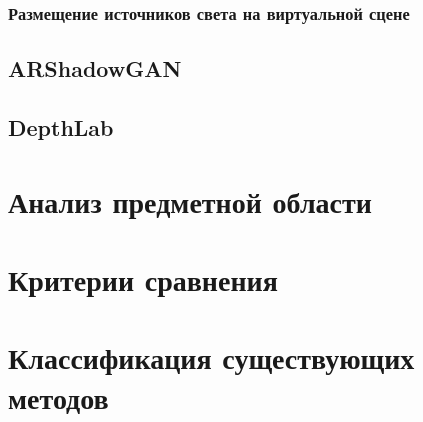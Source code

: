 \subsubsection*{Размещение источников света на виртуальной сцене}



\subsection{ARShadowGAN}



\subsection{DepthLab}



\section{Анализ предметной области}



\section{Критерии сравнения}



\section{Классификация существующих методов}